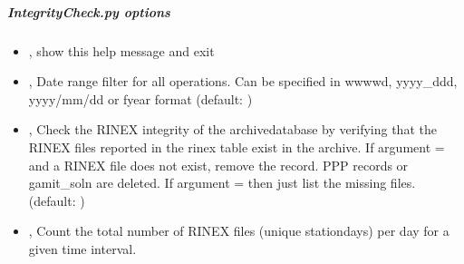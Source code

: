 \documentclass[letterpaper,10pt,english]{sphinxmanual}
\begin{document}
\subparagraph{IntegrityCheck.py options}
\label{\detokenize{pgamit.com:IntegrityCheck.py-options}}\begin{itemize}
\item {} 
\sphinxAtStartPar
{\hyperref[\detokenize{pgamit.com:IntegrityCheck.py--h}]{}}, {\hyperref[\detokenize{pgamit.com:IntegrityCheck.py---help}]{}} \sphinxhyphen{} show this help message and exit

\item {} 
\sphinxAtStartPar
{\hyperref[\detokenize{pgamit.com:IntegrityCheck.py--d}]{}} , {\hyperref[\detokenize{pgamit.com:IntegrityCheck.py---date_filter}]{}}  \sphinxhyphen{} Date range filter for all operations. Can be specified in wwww\sphinxhyphen{}d, yyyy\_ddd, yyyy/mm/dd or fyear format (default: )

\item {} 
\sphinxAtStartPar
{\hyperref[\detokenize{pgamit.com:IntegrityCheck.py--rinex}]{}} , {\hyperref[\detokenize{pgamit.com:IntegrityCheck.py---check_rinex}]{}}  \sphinxhyphen{} Check the RINEX integrity of the archive\sphinxhyphen{}database by verifying that the RINEX files reported in the rinex table exist in the archive. If argument =  and a RINEX file does not exist, remove the record. PPP records or gamit\_soln are deleted. If argument =  then just list the missing files. (default: )

\item {} 
\sphinxAtStartPar
{\hyperref[\detokenize{pgamit.com:IntegrityCheck.py--rnx_count}]{}}, {\hyperref[\detokenize{pgamit.com:IntegrityCheck.py---rinex_count}]{}} \sphinxhyphen{} Count the total number of RINEX files (unique station\sphinxhyphen{}days) per day for a given time interval.


\end{itemize}
\end{document}
